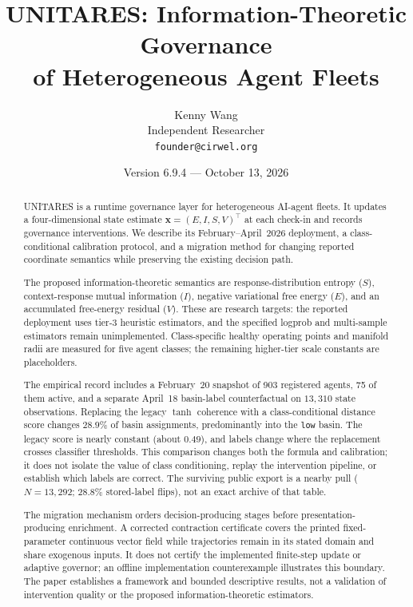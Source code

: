 \documentclass[11pt,twocolumn]{article}
\title{UNITARES: Information-Theoretic Governance\\
of Heterogeneous Agent Fleets}
\author{
  Kenny Wang\\
  Independent Researcher\\
  \texttt{founder@cirwel.org}
}
\date{Version 6.9.4 --- October 13, 2026}
\newcommand{\eisv}{\ensuremath{\mathbf{x}}}
\begin{document}
\maketitle

\begin{abstract}
UNITARES is a runtime governance layer for heterogeneous AI-agent
fleets. It updates a four-dimensional state estimate
$\eisv = (E,I,S,V)^\top$ at each check-in and records governance
interventions. We describe its February--April~2026 deployment,
a class-conditional calibration protocol, and a migration method
for changing reported coordinate semantics while preserving the
existing decision path.

The proposed information-theoretic semantics are response-distribution
entropy ($S$), context-response mutual information ($I$), negative
variational free energy ($E$), and an accumulated free-energy
residual ($V$). These are research targets: the reported deployment
uses tier-3 heuristic estimators, and the specified logprob and
multi-sample estimators remain unimplemented. Class-specific healthy
operating points and manifold radii are measured for five agent
classes; the remaining higher-tier scale constants are placeholders.

The empirical record includes a February~20 snapshot of 903
registered agents, 75 of them active, and a separate April~18
basin-label counterfactual on $13{,}310$ state observations. Replacing
the legacy $\tanh$ coherence with a class-conditional distance score
changes $28.9\%$ of basin assignments, predominantly into the
\texttt{low} basin. The legacy score is nearly constant (about
$0.49$), and labels change where the replacement crosses classifier
thresholds. This comparison changes both the formula and calibration;
it does not isolate the value of class conditioning, replay the
intervention pipeline, or establish which labels are correct.
The surviving public export is a nearby pull ($N=13{,}292$;
$28.8\%$ stored-label flips), not an exact archive of that table.

The migration mechanism orders decision-producing stages before
presentation-producing enrichment. A corrected contraction certificate
covers the printed fixed-parameter continuous vector field while
trajectories remain in its stated domain and share exogenous inputs.
It does not certify the implemented finite-step update or adaptive
governor; an offline implementation counterexample illustrates this
boundary. The paper establishes a framework and bounded descriptive
results, not a validation of intervention quality or the proposed
information-theoretic estimators.
\end{abstract}
\end{document}
